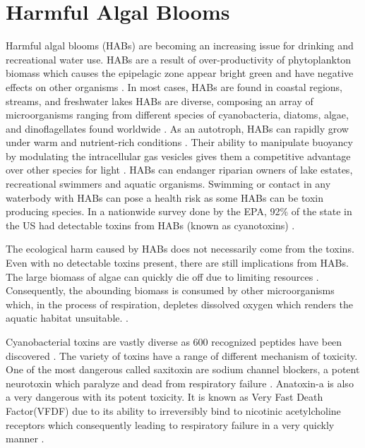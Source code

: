 



\section{Harmful Algal Blooms}



Harmful algal blooms (HABs) are becoming an increasing issue for drinking and recreational water use.
HABs are a result of over-productivity of phytoplankton biomass which causes the epipelagic zone appear bright green and have negative effects on other organisms \cite{moore_richard_cyanobacterial_1993}. In most cases, HABs are found in coastal regions, streams, and freshwater lakes \cite{rastogi_cyanotoxin-microcystins:_2014}
HABs are diverse, composing an array of  microorganisms ranging from  different species of cyanobacteria, diatoms, algae, and dinoflagellates found worldwide \cite{dittmann_cyanobacterial_2012}.
As an autotroph, HABs can rapidly grow under warm and nutrient-rich conditions \cite{rastogi_cyanotoxin-microcystins:_2014}. Their ability to manipulate buoyancy by modulating the intracellular gas vesicles gives them a competitive advantage over other species for light \cite{feng_how_2018}. HABs can endanger riparian owners of lake estates, recreational swimmers and aquatic organisms. Swimming or contact in any waterbody with HABs can pose a health risk as some HABs can be toxin producing species. In a nationwide survey done by the EPA, 92\% of the state in the US had detectable toxins from HABs (known as cyanotoxins) \cite{noauthor_national_2009}.


%
The ecological harm caused by HABs does not necessarily come from the toxins. Even with no detectable toxins present, there are still implications from HABs. The large biomass of algae can quickly die off due to limiting resources \cite{charlton_oxygen_1980}. Consequently, the abounding biomass is consumed by other microorganisms which, in the process of respiration, depletes dissolved oxygen which renders the aquatic habitat unsuitable.  \cite{anderson_harmful_2002}.









Cyanobacterial toxins are vastly diverse as 600 recognized peptides have been discovered \cite{welker_cyanobacterial_2006}. The variety of toxins have a range of different mechanism of toxicity. One of the most dangerous called saxitoxin are sodium channel blockers, a potent neurotoxin which paralyze and dead from respiratory failure \cite{moore_richard_cyanobacterial_1993}.
Anatoxin-a is also a very dangerous with its potent toxicity. It is known as Very Fast Death Factor(VFDF) due to its ability to irreversibly bind to nicotinic acetylcholine receptors which consequently leading to respiratory failure in a very quickly manner \cite{codd_cyanobacterial_1999, moore_richard_cyanobacterial_1993}.

